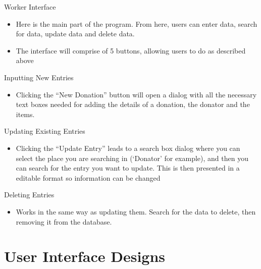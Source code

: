 Worker Interface
\begin{itemize}
	\item Here is the main part of the program. From here, users can enter data, search for data, update data and delete data.
	\item The interface will comprise of 5 buttons, allowing users to do as described above
\end{itemize}


Inputting New Entries
\begin{itemize}
	\item  Clicking the “New Donation” button will open a dialog with all the necessary text boxes needed for adding the details of a donation, the donator and the items.
\end{itemize}

Updating Existing Entries
\begin{itemize}
	\item Clicking the “Update Entry” leads to a search box dialog where you can select the place you are searching in (‘Donator’ for example), and then you can search for the entry you want to update. This is then presented in a editable format so information can be changed

\end{itemize}

Deleting Entries
\begin{itemize}
	\item Works in the same way as updating them. Search for the data to delete, then removing it from the database.
\end{itemize}


\section{User Interface Designs}

